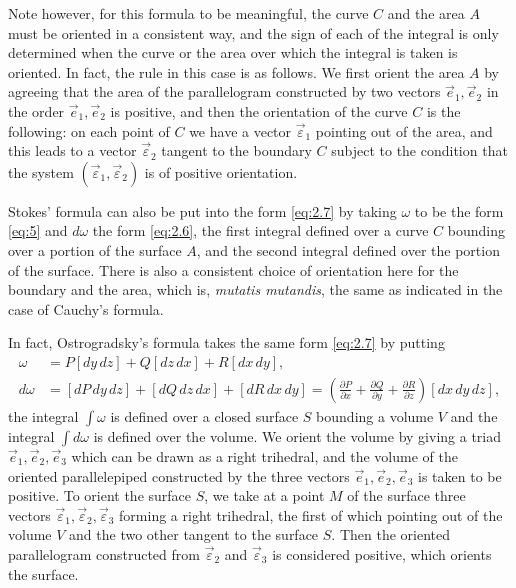 \documentclass[leqno,11pt]{book}
\numberwithin{equation}{chapter}
\newcommand{\pd}{\partial}
\theoremstyle{shape1}
\theoremstyle{shape0}
\theoremstyle{shape2}
\theoremstyle{definition}
\begin{document}
Note however, for this formula to be meaningful, the curve $C$ and the area $A$ must be oriented in a consistent way, and the sign of each of the integral is only determined when the curve or the area over which the integral is taken is oriented. In fact, the rule in this case is as follows. We first orient the area $A$ by agreeing that the area of the parallelogram constructed by two vectors $\vec{e}_{1}, \vec{e}_{2}$ in the order $\vec{e}_{1},\vec{e}_{2}$ is positive, and then the orientation of the curve $C$ is the following: on each point of $C$ we have a vector $\vec{\varepsilon}_{1}$ pointing out of the area, and this leads to a vector $\vec{\varepsilon}_{2}$ tangent to the boundary $C$ subject to the condition that the system $(\vec{\varepsilon}_{1},\vec{\varepsilon}_{2})$ is of positive orientation.

Stokes' formula can also be put into the form \eqref{eq:2.7} by taking $\omega$ to be the form \eqref{eq:5} and $d\omega$ the form \eqref{eq:2.6}, the first integral defined over a curve $C$ bounding over a portion of the surface $A$, and the second integral defined over the portion of the surface. There is also a consistent choice of orientation here for the boundary and the area, which is, \emph{mutatis mutandis}, the same  as indicated in the case of Cauchy's formula.

In fact, Ostrogradsky's formula takes the same form \eqref{eq:2.7} by putting
\begin{align*}
  \omega&=P[dy\,dz]+Q[dz\,dx]+R[dx\,dy],\\
  d\omega&=[dP\,dy\,dz]+[dQ\,dz\,dx]+[dR\,dx\,dy]=\left(\frac{\pd P}{\pd x}+\frac{\pd Q}{\pd y}+\frac{\pd R}{\pd z}\right)[dx\,dy\,dz],
\end{align*}
the integral $\int \omega$ is defined over a closed surface $S$ bounding a volume $V$ and the integral $\int d\omega$ is defined over the volume. We orient the volume by giving a triad $\vec{e}_{1},\vec{e}_{2},\vec{e}_{3}$ which can be drawn as a right trihedral, and the volume of the oriented parallelepiped constructed by the three vectors $\vec{e}_{1},\vec{e}_{2},\vec{e}_{3}$ is taken to be positive. To orient the surface $S$, we take at a point $M$ of the surface three vectors $\vec{\varepsilon}_{1},\vec{\varepsilon}_{2},\vec{\varepsilon}_{3}$ forming a right trihedral, the first of which pointing out of the volume $V$ and the two other tangent to the surface $S$. Then the oriented parallelogram constructed from $\vec{\varepsilon}_{2}$ and $\vec{\varepsilon}_{3}$ is considered positive, which orients the surface.
\end{document}
